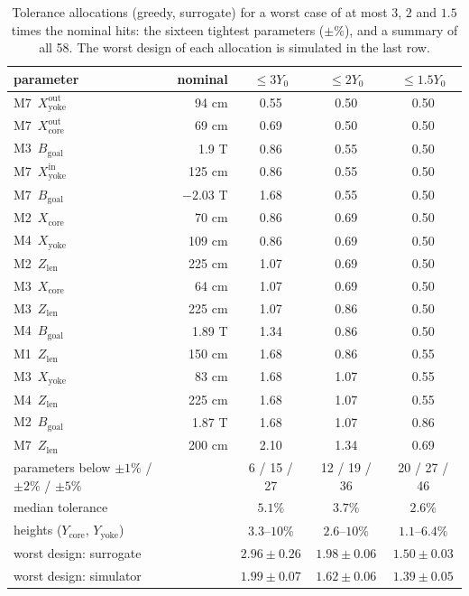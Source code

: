 \documentclass[11pt,a4paper]{article}
\begin{document}
\begin{table}[!htb]
\centering
\caption{Tolerance allocations (greedy, surrogate) for a worst case of at most $3$, $2$ and $1.5$
times the nominal hits: the sixteen tightest parameters ($\pm\%$), and a summary of all 58. The
worst design of each allocation is simulated in the last row.}
\label{tab:allocation}
\small
\begin{tabular}{lrccc}
\toprule
parameter & nominal & $\le3Y_0$ & $\le2Y_0$ & $\le1.5Y_0$ \\
\midrule
M7~$X_\mathrm{yoke}^\mathrm{out}$    & 94 cm    & 0.55 & 0.50 & 0.50 \\
M7~$X_\mathrm{core}^\mathrm{out}$        & 69 cm    & 0.69 & 0.50 & 0.50 \\
M3~$B_\mathrm{goal}$                   & 1.9 T    & 0.86 & 0.55 & 0.50 \\
M7~$X_\mathrm{yoke}^\mathrm{in}$     & 125 cm   & 0.86 & 0.55 & 0.50 \\
M7~$B_\mathrm{goal}$                   & $-2.03$ T & 1.68 & 0.55 & 0.50 \\
M2~$X_\mathrm{core}$         & 70 cm    & 0.86 & 0.69 & 0.50 \\
M4~$X_\mathrm{yoke}$     & 109 cm   & 0.86 & 0.69 & 0.50 \\
M2~$Z_\mathrm{len}$       & 225 cm   & 1.07 & 0.69 & 0.50 \\
M3~$X_\mathrm{core}$         & 64 cm    & 1.07 & 0.69 & 0.50 \\
M3~$Z_\mathrm{len}$       & 225 cm   & 1.07 & 0.86 & 0.50 \\
M4~$B_\mathrm{goal}$                   & 1.89 T   & 1.34 & 0.86 & 0.50 \\
M1~$Z_\mathrm{len}$       & 150 cm   & 1.68 & 0.86 & 0.55 \\
M3~$X_\mathrm{yoke}$     & 83 cm    & 1.68 & 1.07 & 0.55 \\
M4~$Z_\mathrm{len}$       & 225 cm   & 1.68 & 1.07 & 0.55 \\
M2~$B_\mathrm{goal}$                   & 1.87 T   & 1.68 & 1.07 & 0.86 \\
M7~$Z_\mathrm{len}$       & 200 cm   & 2.10 & 1.34 & 0.69 \\
\midrule
parameters below $\pm1\%$ / $\pm2\%$ / $\pm5\%$ & & 6 / 15 / 27 & 12 / 19 / 36 & 20 / 27 / 46 \\
median tolerance & & $5.1\%$ & $3.7\%$ & $2.6\%$ \\
heights ($Y_\mathrm{core}$, $Y_\mathrm{yoke}$) & & $3.3$--$10\%$ & $2.6$--$10\%$ & $1.1$--$6.4\%$ \\
\midrule
worst design: surrogate & & $2.96\pm0.26$ & $1.98\pm0.06$ & $1.50\pm0.03$ \\
worst design: simulator & & $1.99\pm0.07$ & $1.62\pm0.06$ & $1.39\pm0.05$ \\
\bottomrule
\end{tabular}
\end{table}
\end{document}
